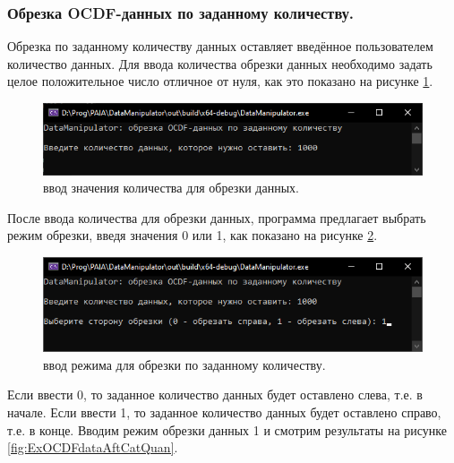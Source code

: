 \subsubsection{ \standartTitleFont
  Обрезка OCDF-данных по заданному количеству. 
}

{\standartFont

  \par Обрезка по заданному количеству данных оставляет введённое пользователем количество данных. Для ввода количества обрезки данных необходимо задать целое положительное число отличное от нуля, как это показано на рисунке \ref{fig:OCDFcutquan1}. 

  \begin{figure}[H]
    \centering
    \includegraphics{images/forDataManipulator/OCDFcutquantitystage1.png}
    \caption{ввод значения количества для обрезки данных.} 
    \label{fig:OCDFcutquan1}
  \end{figure}

  \par После ввода количества для обрезки данных, программа предлагает выбрать режим обрезки, введя значения 0 или 1, как показано на рисунке \ref{fig:OCDFcutquan2}. 

  \begin{figure}[H]
    \centering
    \includegraphics{images/forDataManipulator/OCDFcutquantitystage2.png}
    \caption{ввод режима для обрезки по заданному количеству.} 
    \label{fig:OCDFcutquan2}
  \end{figure}

  \par Если ввести 0, то заданное количество данных будет оставлено слева, т.е. в начале. Если ввести 1, то заданное количество данных будет оставлено справо, т.е. в конце. Вводим режим обрезки данных 1 и смотрим результаты на рисунке \ref{fig:ExOCDFdataAftCatQuan}. 

}
